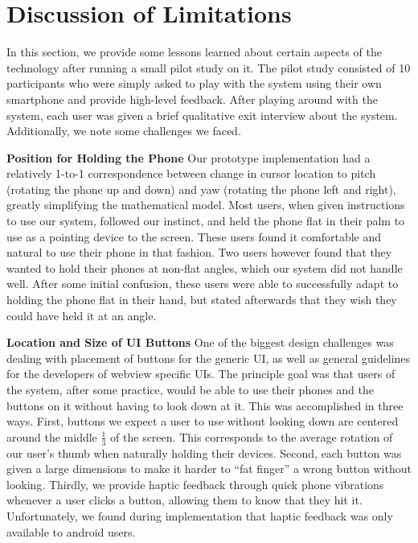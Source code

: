 \section{Discussion of Limitations}\label{chap04:limitations}

In this section, we provide some lessons learned about certain
aspects of the technology after running a small pilot study on
it. The pilot study consisted of 10 participants who were simply
asked to play with the system using their own smartphone and
provide high-level feedback. After playing around with the system,
each user was given a brief qualitative exit interview about the
system. Additionally, we note some challenges we faced.

\textbf{Position for Holding the Phone} Our prototype implementation had a relatively 1-to-1
correspondence between change in cursor location to pitch (rotating
the phone up and down) and yaw (rotating the phone left and right),
greatly simplifying the mathematical model. Most users, when given
instructions to use our system, followed our instinct, and held the
phone flat in their palm to use as a pointing device to the screen.
These users found it comfortable and natural to use their phone in
that fashion. Two users however found that they wanted to hold
their phones at non-flat angles, which our system did not handle well.
After some initial confusion, these users were able to successfully
adapt to holding the phone flat in their hand, but stated afterwards
that they wish they could have held it at an angle.

\textbf{Location and Size of UI Buttons} One of the biggest design challenges was dealing with placement of
buttons for the generic UI, as well as general guidelines for the
developers of webview specific UIs. The principle goal was that
users of the system, after some practice, would be able to use
their phones and the buttons on it without having to look down
at it. This was accomplished in three ways. First, buttons we expect a
user to use without looking down are centered around the middle
$\frac{1}{3}$ of the screen. This corresponds to the average rotation
of our user's thumb when naturally holding their devices. Second,
each button was given a large dimensions to make it harder to ``fat
finger'' a wrong button without looking. Thirdly, we provide haptic
feedback through quick phone vibrations whenever a user clicks a
button, allowing them to know that they hit it. Unfortunately, we
found during implementation that haptic feedback was only available
to android users.


